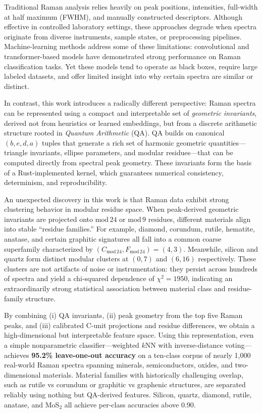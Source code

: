 \documentclass[12pt]{article}
\begin{document}
Traditional Raman analysis relies heavily on peak positions, intensities, full-width at half maximum
(FWHM), and manually constructed descriptors. Although effective in controlled laboratory settings, these
approaches degrade when spectra originate from diverse instruments, sample states, or preprocessing
pipelines. Machine-learning methods address some of these limitations: convolutional and transformer-based
models have demonstrated strong performance on Raman classification tasks. Yet these models tend to operate
as black boxes, require large labeled datasets, and offer limited insight into why certain spectra are
similar or distinct.  

In contrast, this work introduces a radically different perspective: Raman spectra can be represented using
a compact and interpretable set of \emph{geometric invariants}, derived not from heuristics or learned
embeddings, but from a discrete arithmetic structure rooted in \emph{Quantum Arithmetic} (QA). QA builds
on canonical $(b,e,d,a)$ tuples that generate a rich set of harmonic geometric quantities—triangle
invariants, ellipse parameters, and modular residues—that can be computed directly from spectral peak
geometry. These invariants form the basis of a Rust-implemented kernel, which guarantees numerical
consistency, determinism, and reproducibility.

An unexpected discovery in this work is that Raman data exhibit strong clustering behavior in modular
residue space. When peak-derived geometric invariants are projected onto $\mathrm{mod}\,24$ or
$\mathrm{mod}\,9$ residues, different materials align into stable “residue families.” For example,
diamond, corundum, rutile, hematite, anatase, and certain graphitic signatures all fall into a common
coarse superfamily characterized by $(C_{\mathrm{mod}\,24},F_{\mathrm{mod}\,24}) = (4,3)$. Meanwhile,
silicon and quartz form distinct modular clusters at $(0,7)$ and $(6,16)$ respectively. These clusters are
not artifacts of noise or instrumentation: they persist across hundreds of spectra and yield a chi-squared
dependence of $\chi^2 = 1950$, indicating an extraordinarily strong statistical association between
material class and residue-family structure.

By combining (i) QA invariants, (ii) peak geometry from the top five Raman peaks, and (iii) calibrated
C-unit projections and residue differences, we obtain a high-dimensional but interpretable feature space.
Using this representation, even a simple nonparametric classifier—weighted $k$NN with inverse-distance
voting—achieves \textbf{95.2\% leave-one-out accuracy} on a ten-class corpus of nearly 1,000 real-world
Raman spectra spanning minerals, semiconductors, oxides, and two-dimensional materials. Material families
with historically challenging overlap, such as rutile vs corundum or graphitic vs graphenic structures, are
separated reliably using nothing but QA-derived features. Silicon, quartz, diamond, rutile, anatase, and
MoS$_2$ all achieve per-class accuracies above 0.90.
\end{document}
